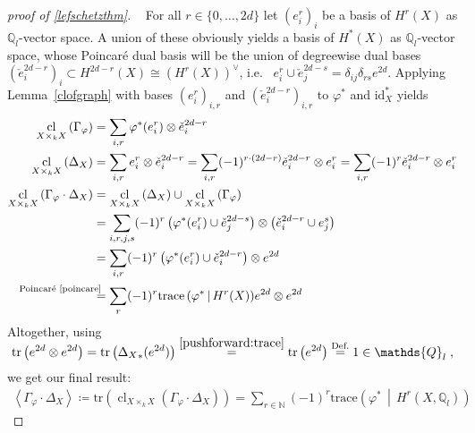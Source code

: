 \documentclass[english,headsepline=0.25pt]{scrartcl}
\theoremstyle{definition}
\theoremstyle{remark}
\newcommand*{\N}{\mathds{N}}
\newcommand*{\Z}{\mathds{Z}}
\newcommand*{\Q}{\mathds{Q}}
\newcommand*{\Zl}{\Z_l} %
\newcommand*{\Ql}{\Q_l} %
\newcommand*{\id}{\text{id}} %
\newcommand*{\idest}{i.e.\ }
\newcommand*{\Tr}{\text{tr}} %
\newcommand*{\tr}[1]{\Tr\left(#1\right)} %
\newcommand*{\intProd}[2]{{#1\cdot#2}} %
\newcommand*{\intNum}[1]{{\left\langle{#1}\right\rangle}} %
\newcommand*{\Graph}[1]{{\Gamma_{#1}}} %
\newcommand*{\Diag}[1]{{\Delta_{#1}}} %
\newcommand*{\trace}[2]{{\text{trace}\left(#1 \,\middle|\, #2 \right)}} %
\DeclareMathOperator{\CL}{cl} %
\newcommand*{\cl}[2]{{\CL_{#1}\left(#2\right)}} %
\renewcommand*{\phi}{\varphi}
\newcommand*{\Poincare}{{\text{Poincaré \ref{poincare}}}}
\newcommand*{\dual}[1]{\check{#1}} %
\begin{document}
    \begin{proof}[proof of \ref{lefschetzthm}]~
    For all $r\in\{0,\dotsc,2d\}$ let $(e_i^r)_{i}$ be a basis of
    $H^r(X)$ as $\Ql$-vector space. A union of these obviously yields
    a basis of $H^*(X)$ as $\Ql$-vector space, whose Poincaré dual
    basis will be the union of degreewise dual bases
    $(\dual e_i^{2d-r})_{i}\subset H^{2d-r}(X)\cong (H^{r}(X))^\vee$,
    \idest
    $e^r_i\cup \dual e_j^{2d-s}=\delta_{ij}\delta_{rs}e^{2d}$.
    Applying Lemma~\ref{clofgraph} with bases $(e_i^r)_{i,r}$ and
    $(\dual e_i^{2d-r})_{i,r}$ to $\phi^*$ and $\id_X^*$ yields
    \begin{align*}
      \cl{X\times_k X}{\Graph{\phi}}
      &= \sum_{i,r} \phi^*(e_i^r)\otimes \dual e_i^{2d-r}\\
      \cl{X\times_k X}{\Diag{X}}
      &= \sum_{i,r} e_i^r\otimes \dual e_i^{2d-r} =
        \sum_{i,r} (-1)^{r\cdot (2d-r)}\dual e_i^{2d-r}\otimes e_i^{r} =
        \sum_{i,r} (-1)^{r}\dual e_i^{2d-r}\otimes e_i^r\\
      \cl{X\times_k X}{\intProd{\Graph{\phi}}{\Diag{X}}}
      &= \cl{X\times_k X}{\Diag{X}} \cup \cl{X\times_k X}{\Graph{\phi}}\\
      &= \sum_{i,r,j,s} (-1)^{r}
        \left(\phi^*(e_i^r)\cup \dual e_j^{2d-s}\right)
        \otimes \left(\dual e_i^{2d-r}\cup e_j^s\right)\\
      &= \sum_{i,r} (-1)^{r}
        \left(\phi^*(e_i^r)\cup \dual e_i^{2d-r}\right)
        \otimes e^{2d}\\
      &\overset{\mathllap{\Poincare}}=
        \sum_{r} (-1)^r \trace{\phi^*}{H^r(X)} e^{2d} \otimes e^{2d}
    \end{align*}
    Altogether, using
    \begin{align*}
      \SwapAboveDisplaySkip
      \tr{e^{2d} \otimes e^{2d}}
      = \tr{\Diag{X}_*(e^{2d})}
      \overset{\ref{pushforward:trace}}= \tr{e^{2d}}
      \overset{\text{Def.}}= 1\in\Ql
      \;,
    \end{align*}
    we get our final result:
    \begin{gather*}
      \intNum{\intProd{\Graph\phi}{\Diag X}} \coloneqq
      \tr{\cl{X\times_kX}{\intProd{\Graph\phi}{\Diag X}}}
      = \sum_{r\in\N} (-1)^r \trace{\phi^*}{H^r(X,\Ql)}
    \end{gather*}
\end{proof}

\nocite{*}
\printbibliography
\end{document}
